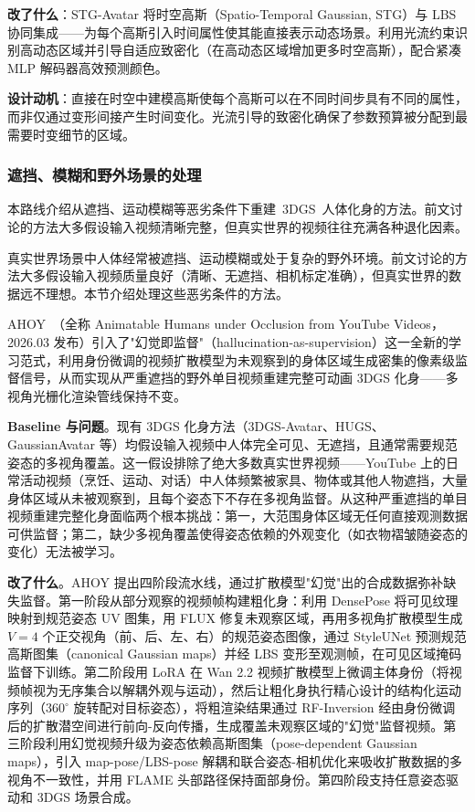 \textbf{改了什么}：STG-Avatar 将时空高斯（Spatio-Temporal Gaussian, STG）与 LBS 协同集成——为每个高斯引入时间属性使其能直接表示动态场景。利用光流约束识别高动态区域并引导自适应致密化（在高动态区域增加更多时空高斯），配合紧凑 MLP 解码器高效预测颜色。

\textbf{设计动机}：直接在时空中建模高斯使每个高斯可以在不同时间步具有不同的属性，而非仅通过变形间接产生时间变化。光流引导的致密化确保了参数预算被分配到最需要时变细节的区域。

\subsubsection{遮挡、模糊和野外场景的处理}

本路线介绍从遮挡、运动模糊等恶劣条件下重建~3DGS~人体化身的方法。前文讨论的方法大多假设输入视频清晰完整，但真实世界的视频往往充满各种退化因素。

真实世界场景中人体经常被遮挡、运动模糊或处于复杂的野外环境。前文讨论的方法大多假设输入视频质量良好（清晰、无遮挡、相机标定准确），但真实世界的数据远不理想。本节介绍处理这些恶劣条件的方法。

AHOY~\cite{2603_17975}（全称 Animatable Humans under Occlusion from YouTube Videos，2026.03 发布）引入了"幻觉即监督"（hallucination-as-supervision）这一全新的学习范式，利用身份微调的视频扩散模型为未观察到的身体区域生成密集的像素级监督信号，从而实现从严重遮挡的野外单目视频重建完整可动画 3DGS 化身——多视角光栅化渲染管线保持不变。

\textbf{Baseline 与问题}。现有 3DGS 化身方法（3DGS-Avatar、HUGS、GaussianAvatar 等）均假设输入视频中人体完全可见、无遮挡，且通常需要规范姿态的多视角覆盖。这一假设排除了绝大多数真实世界视频——YouTube 上的日常活动视频（烹饪、运动、对话）中人体频繁被家具、物体或其他人物遮挡，大量身体区域从未被观察到，且每个姿态下不存在多视角监督。从这种严重遮挡的单目视频重建完整化身面临两个根本挑战：第一，大范围身体区域无任何直接观测数据可供监督；第二，缺少多视角覆盖使得姿态依赖的外观变化（如衣物褶皱随姿态的变化）无法被学习。

\textbf{改了什么}。AHOY 提出四阶段流水线，通过扩散模型"幻觉"出的合成数据弥补缺失监督。第一阶段从部分观察的视频帧构建粗化身：利用 DensePose 将可见纹理映射到规范姿态 UV 图集，用 FLUX 修复未观察区域，再用多视角扩散模型生成 $V{=}4$ 个正交视角（前、后、左、右）的规范姿态图像，通过 StyleUNet 预测规范高斯图集（canonical Gaussian maps）并经 LBS 变形至观测帧，在可见区域掩码监督下训练。第二阶段用 LoRA 在 Wan 2.2 视频扩散模型上微调主体身份（将视频帧视为无序集合以解耦外观与运动），然后让粗化身执行精心设计的结构化运动序列（$360^{\circ}$ 旋转配对目标姿态），将粗渲染结果通过 RF-Inversion 经由身份微调后的扩散潜空间进行前向-反向传播，生成覆盖未观察区域的"幻觉"监督视频。第三阶段利用幻觉视频升级为姿态依赖高斯图集（pose-dependent Gaussian maps），引入 map-pose/LBS-pose 解耦和联合姿态-相机优化来吸收扩散数据的多视角不一致性，并用 FLAME 头部路径保持面部身份。第四阶段支持任意姿态驱动和 3DGS 场景合成。

